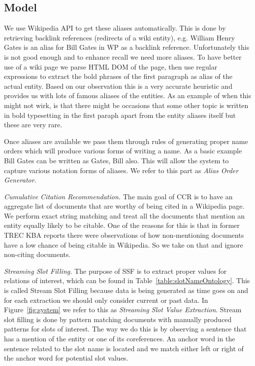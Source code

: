 \subsection{Model}

We use Wikipedia API to get these aliases automatically. This is done by retrieving backlink references (redirects of a wiki entity), e.g. William Henry Gates is an alias for Bill Gates in WP as a backlink reference. Unfortunately this is not good enough and to enhance recall we need more aliases. To have better use of a wiki page we parse HTML DOM of the page, then use regular expressions to extract the bold phrases of the first paragraph as alias of the actual entity. Based on our observation this is a very accurate heuristic and provides us with lots of famous aliases of the entities. As an example of when this might not wirk, is that there might be occasions that some other topic is written in bold typesetting in the first paraph apart from the entity aliases itself but these are very rare.

Once aliases are available we pass them through rules of generating proper name orders which will produce various forms of writing a name. As a basic example Bill Gates can be written as Gates, Bill also. This will allow the system to capture various notation forms of aliases. We refer to this part as \textit{Alias Order Generator}.

\textit{Cumulative Citation Recommendation.}
The main goal of CCR is to have an aggregate list of documents that are worthy of being cited in a Wikipedia page. We perform exact string matching and treat all the documents that mention an entity equally likely to be citable. One of the reasons for this is that in former TREC KBA reports \cite{JFrank12} there were observations of how non-mentioning documents have a low chance of being citable in Wikipedia. So we take on that and ignore non-citing documents. 






\textit{Streaming Slot Filling.}
The purpose of SSF is to extract proper values for relations of interest, which can be found in Table~\ref{table:slotNameOntology}. This is called Stream Slot Filling because data is being generated as time goes
on and for each extraction we should only consider current or past data. In Figure~\ref{fig:system} we refer to this as \textit{Streaming Slot Value Extraction}. Stream slot filling is done by pattern matching documents with manually produced patterns for slots of interest. The way we do this is by observing a sentence that has a mention of the entity or one of its coreferences. An anchor word in the sentence related to the slot name is located and we match either left or right of the anchor word for potential slot values. 

